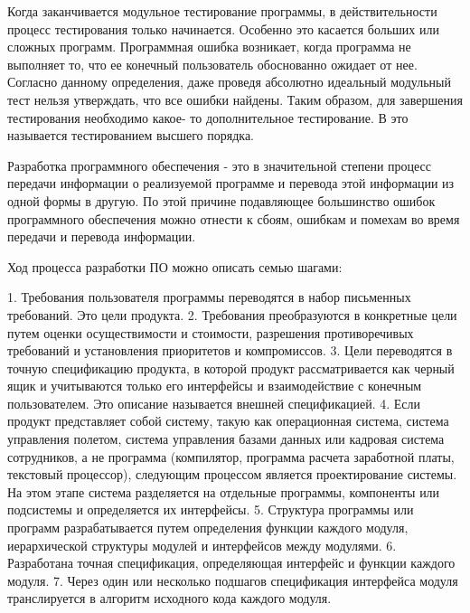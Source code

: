 Когда заканчивается модульное тестирование программы, в действительности процесс тестирования 
только начинается. Особенно это касается больших или сложных программ. Программная ошибка возникает, когда программа не выполняет то, что ее конечный пользователь обоснованно ожидает от 
нее. Согласно данному определения, даже проведя абсолютно идеальный модульный тест нельзя 
утверждать, что все ошибки найдены. Таким образом, для завершения тестирования необходимо какое-
то дополнительное тестирование. В\autocite{artoftesting} это называется тестированием высшего 
порядка.

Разработка программного обеспечения - это в значительной степени процесс передачи информации о 
реализуемой программе и перевода этой информации из одной формы в другую. По этой причине 
подавляющее большинство ошибок программного обеспечения можно отнести к сбоям, ошибкам и 
помехам во время передачи и перевода информации.

Ход процесса разработки ПО можно описать семью шагами:

1. Требования пользователя программы переводятся в набор письменных требований. Это цели продукта.
2. Требования преобразуются в конкретные цели путем оценки осуществимости и стоимости, разрешения противоречивых требований и установления приоритетов и компромиссов.
3. Цели переводятся в точную спецификацию продукта, в которой продукт рассматривается как черный ящик и учитываются только его интерфейсы и взаимодействие с конечным пользователем. Это описание называется внешней спецификацией.
4. Если продукт представляет собой систему, такую как операционная система, система управления полетом, система управления базами данных или кадровая система сотрудников, а не программа (компилятор, программа расчета заработной платы, текстовый процессор), следующим процессом является проектирование системы. На этом этапе система разделяется на отдельные программы, компоненты или подсистемы и определяется их интерфейсы.
5. Структура программы или программ разрабатывается путем определения функции каждого модуля, иерархической структуры модулей и интерфейсов между модулями.
6. Разработана точная спецификация, определяющая интерфейс и функции каждого модуля.
7. Через один или несколько подшагов спецификация интерфейса модуля транслируется в алгоритм исходного кода каждого модуля.

